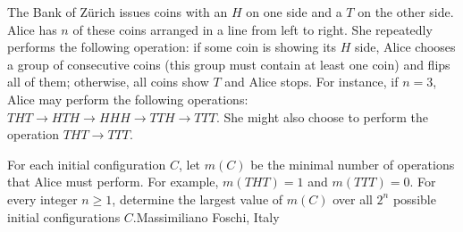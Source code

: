 The Bank of Zürich issues coins with an $H$ on one side and a $T$ on the other side. Alice has $n$ of these coins arranged in a line from left to right. She repeatedly performs the following operation: if some coin is showing its $H$ side, Alice chooses a group of consecutive coins (this group must contain at least one coin) and flips all of them; otherwise, all coins show $T$ and Alice stops. For instance, if $n = 3$,  Alice may perform the following operations: $THT \to HTH \to HHH \to TTH \to TTT$. She might also choose to perform the operation $THT \to TTT$.

For each initial configuration $C$,  let $m(C)$ be the minimal number of operations that Alice must perform. For example, $m(THT) = 1$ and $m(TTT) = 0$. For every integer $n \geq 1$,  determine the largest value of $m(C)$ over all $2^n$ possible initial configurations $C$.Massimiliano Foschi, Italy